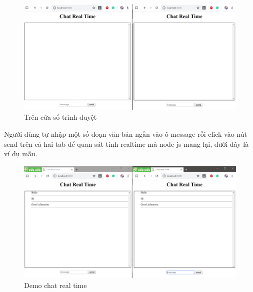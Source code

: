\documentclass{report}
\begin{document}
\begin{center}
    \begin{figure}[htp]
    \begin{center}
     \includegraphics[scale=0.4]{chat.png}
    \end{center}
    \caption{Trên cửa sổ trình duyệt}
    \label{refhinh1}
    \end{figure}
\end{center}

Người dùng tự nhập một số đoạn văn bản ngắn vào ô message rồi click vào nút send trên cả hai tab để quan sát tính realtime mà node js mang lại, dưới đây là ví dụ mẫu.

\begin{center}
    \begin{figure}[htp]
    \begin{center}
     \includegraphics[scale=0.4]{chat2.png}
    \end{center}
    \caption{Demo chat real time}
    \label{refhinh1}
    \end{figure}
\end{center}

\newpage

\newpage
\end{document}
